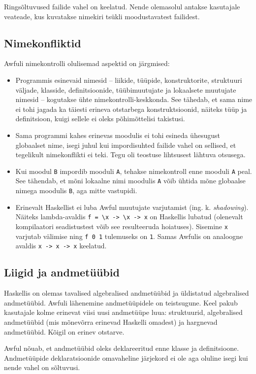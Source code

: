 \documentclass[12pt]{article}
\begin{document}
      Ringsõltuvused failide vahel on keelatud. Nende olemasolul antakse kasutajale veateade, kus kuvatakse nimekiri tsükli moodustavatest failidest.
    \subsection{Nimekonfliktid}
      Awfuli nimekontrolli olulisemad aspektid on järgmised:

      \begin{itemize}
        \item
          Programmis esinevaid nimesid -- liikide, tüüpide, konstruktorite, struktuuri väljade, klasside, definitsioonide, tüübimuutujate ja lokaalsete muutujate nimesid -- kogutakse ühte nimekontrolli-keskkonda. See tähedab, et sama nime ei tohi jagada ka täiesti erineva otstarbega konstruktsioonid, näiteks tüüp ja definitsioon, kuigi sellele ei oleks põhimõttelisi takistusi.
        \item
          Sama programmi kahes erinevas moodulis ei tohi esineda ühesugust globaalset nime, isegi juhul kui impordisuhted failide vahel on sellised, et tegelikult nimekonflikti ei teki. Tegu oli teostuse lihtsusest lähtuva otsusega.
        \item
          Kui moodul \verb!B! impordib mooduli \verb!A!, tehakse nimekontroll enne mooduli \verb!A! peal. See tähendab, et mõni lokaalne nimi moodulis \verb!A! võib ühtida mõne globaalse nimega moodulis \verb!B!, aga mitte vastupidi.
        \item
          Erinevalt Haskellist ei luba Awful muutujate varjutamist (ing. k. \textit{shadowing}). Näiteks lambda-avaldis \verb!f = \x -> \x -> x! on Haskellis lubatud (olenevalt kompilaatori seadistustest võib see resulteeruda hoiatuses). Sisemine \verb!x! varjutab välimise ning \verb!f 0 1! tulemuseks on \verb!1!. Samas Awfulis on analoogne avaldis \verb!x -> x -> x! keelatud.
      \end{itemize}
    \subsection{Liigid ja andmetüübid}
      Haskellis on olemas tavalised algebralised andmetüübid ja üldistatud algebralised andmetüübid. Awfuli lähenemine andmetüüpidele on teistsugune. Keel pakub kasutajale kolme erinevat viisi uusi andmetüüpe luua: struktuurid, algebralised andmetüübid (mis mõnevõrra erinevad Haskelli omadest) ja hargnevad andmetüübid. Kõigil on erinev otstarve.

      Awful nõuab, et andmetüübid oleks deklareeritud enne klasse ja definitsioone. Andmetüüpide deklaratsioonide omavaheline järjekord ei ole aga oluline isegi kui nende vahel on sõltuvusi.
\end{document}
